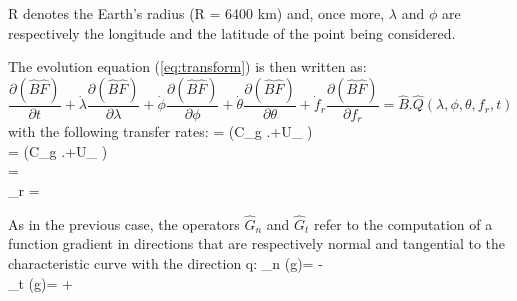 R denotes the Earth's radius (R = 6400 km) and, once more, $\lambda$ and
$\phi$ are respectively the longitude and the latitude of the point being
considered.

 The evolution equation (\ref{eq:transform}) is then written as:
\begin{equation} \label{GrindEQ__4_24_}
  \frac{\partial (\hat{B}\hat{F})}{\partial t} +\dot{\lambda }\frac{\partial
    (\hat{B}\hat{F})}{\partial \lambda } +\dot{\phi }\frac{\partial
    (\hat{B}\hat{F})}{\partial \phi } +\dot{\theta }\frac{\partial
    (\hat{B}\hat{F})}{\partial \theta } +\dot{f}_r \frac{\partial
    (\hat{B}\hat{F})}{\partial f_r} =\hat{B}.\hat{Q}(\lambda,\phi,\theta,f_r,t)
\end{equation}
with the following transfer rates:
\bequ
\label{eq:equ4_25}
\dsp \dot{\lambda }= \left(C_g .\sin \theta +U_{\lambda }
\right) \\[6pt]
\dsp \dot{\phi}= \left(C_g .\cos \theta +U_{\phi } \right)\\[6pt]
\dsp \dot{\theta }= \\[6pt]
\dsp {}_r = 
\earr
\eequ

As in the previous case, the operators $\hat{G}_n $ and $\hat{G}_t $ refer to
the computation of a function gradient in directions that are respectively
normal and tangential to the characteristic curve with the direction q:
\bequ
\label{eq:equ4_26}
\dsp {}_n (g)=\frac{\cos \theta }{\cos \phi } \; 
     {\partial \lambda } \; -\sin \theta \; 
     \\[6pt]
\dsp {}_t (g)=\frac{\sin \theta }{\cos \phi } \; 
     {\partial \lambda } \; +\cos \theta \;  
\earr
\eequ

